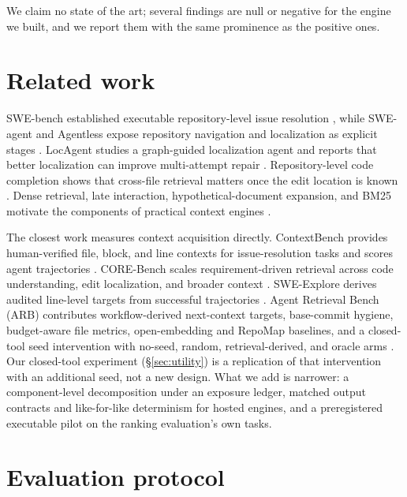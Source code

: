 \documentclass{article}
\begin{document}
We claim no state of the art; several findings are null or negative for the engine we built, and we report them with the same prominence as the positive ones.

\section{Related work}

SWE-bench established executable repository-level issue resolution
\citep{swebench}, while SWE-agent and Agentless expose repository navigation and
localization as explicit stages \citep{sweagent,agentless}. LocAgent studies a
graph-guided localization agent and reports that better localization can improve
multi-attempt repair \citep{locagent}. Repository-level code completion shows that cross-file retrieval matters once
the edit location is known \citep{repocoder,coderag}. Dense retrieval, late interaction, hypothetical-document expansion, and BM25
motivate the components of practical context engines
\citep{karpukhin2020,khattab2020,gao2023hyde,bm25}.

The closest work measures context acquisition directly. ContextBench provides
human-verified file, block, and line contexts for issue-resolution tasks and
scores agent trajectories \citep{contextbench}. CORE-Bench scales
requirement-driven retrieval across code understanding, edit localization, and
broader context \citep{corebench}. SWE-Explore derives audited line-level
targets from successful trajectories \citep{sweexplore}. Agent Retrieval Bench
(ARB) contributes workflow-derived next-context targets, base-commit hygiene,
budget-aware file metrics, open-embedding and RepoMap baselines, and a
closed-tool seed intervention with no-seed, random, retrieval-derived, and
oracle arms \citep{arb}. Our closed-tool experiment (\S\ref{sec:utility}) is a
replication of that intervention with an additional seed, not a new design. What
we add is narrower: a component-level decomposition under an exposure ledger,
matched output contracts and like-for-like determinism for hosted engines, and a
preregistered executable pilot on the ranking evaluation's own tasks.

\section{Evaluation protocol}
\label{sec:protocol}
\end{document}
